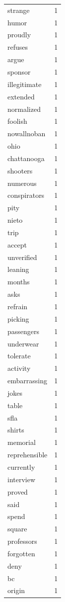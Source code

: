 \begin{tabular}{lr}
strange & 1 \\
humor & 1 \\
proudly & 1 \\
refuses & 1 \\
argue & 1 \\
sponsor & 1 \\
illegitimate & 1 \\
extended & 1 \\
normalized & 1 \\
foolish & 1 \\
nowallnoban & 1 \\
ohio & 1 \\
chattanooga & 1 \\
shooters & 1 \\
numerous & 1 \\
conspirators & 1 \\
pity & 1 \\
nieto & 1 \\
trip & 1 \\
accept & 1 \\
unverified & 1 \\
leaning & 1 \\
months & 1 \\
asks & 1 \\
refrain & 1 \\
picking & 1 \\
passengers & 1 \\
underwear & 1 \\
tolerate & 1 \\
activity & 1 \\
embarrassing & 1 \\
jokes & 1 \\
table & 1 \\
sfla & 1 \\
shirts & 1 \\
memorial & 1 \\
reprehensible & 1 \\
currently & 1 \\
interview & 1 \\
proved & 1 \\
said & 1 \\
spend & 1 \\
square & 1 \\
professors & 1 \\
forgotten & 1 \\
deny & 1 \\
bc & 1 \\
origin & 1 \\

\end{tabular}
